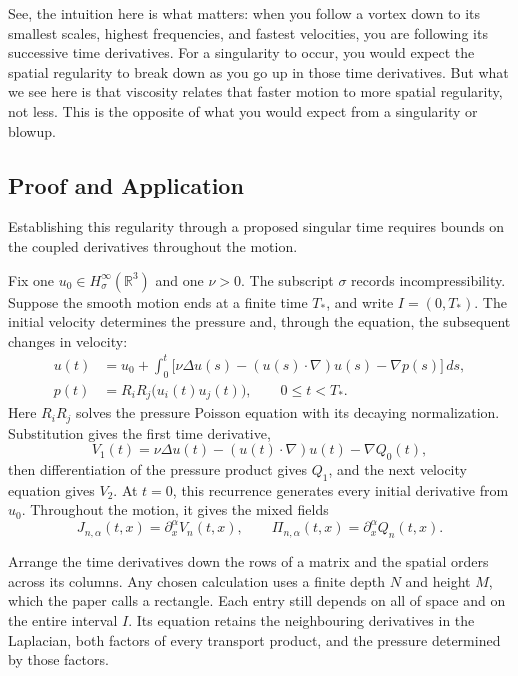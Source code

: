 See, the intuition here is what matters: when you follow a vortex down to
its smallest scales, highest frequencies, and fastest velocities, you are
following its successive time derivatives. For a singularity to occur,
you would expect the spatial regularity to break down as you go up in
those time derivatives. But what we see here is that viscosity relates
that faster motion to more spatial regularity, not less. This is the
opposite of what you would expect from a singularity or blowup.

\vspace{2\baselineskip}
\subsection*{Proof and Application}

Establishing this regularity through a proposed singular time requires bounds
on the coupled derivatives throughout the motion.

Fix one \(u_0\in H^\infty_\sigma(\mathbb R^3)\) and one \(\nu>0\).
The subscript \(\sigma\) records incompressibility. Suppose the smooth
motion ends at a finite time \(T_*\), and write \(I=(0,T_*)\).
The initial velocity determines the pressure and, through the equation,
the subsequent changes in velocity:
\[
 \begin{aligned}
 u(t)&=u_0+\int_0^t
 \bigl[\nu\Delta u(s)-(u(s)\cdot\nabla)u(s)-\nabla p(s)\bigr]\,ds,\\
 p(t)&=R_iR_j\bigl(u_i(t)u_j(t)\bigr),
 \qquad 0\le t<T_*.
 \end{aligned}
\]
Here \(R_iR_j\) solves the pressure Poisson equation with its decaying
normalization. Substitution gives the first time derivative,
\[
 V_1(t)=\nu\Delta u(t)-(u(t)\cdot\nabla)u(t)-\nabla Q_0(t),
\]
then differentiation of the pressure product gives \(Q_1\), and the
next velocity equation gives \(V_2\). At \(t=0\), this recurrence
generates every initial derivative from \(u_0\). Throughout the motion,
it gives the mixed fields
\[
 J_{n,\alpha}(t,x)=\partial_x^\alpha V_n(t,x),
 \qquad
 \Pi_{n,\alpha}(t,x)=\partial_x^\alpha Q_n(t,x).
\]

Arrange the time derivatives down the rows of a matrix and the spatial
orders across its columns. Any chosen calculation uses a finite depth
\(N\) and height \(M\), which the paper calls a rectangle. Each entry
still depends on all of space and on the entire interval \(I\).
Its equation retains the neighbouring derivatives in the Laplacian,
both factors of every transport product, and the pressure determined by
those factors.

